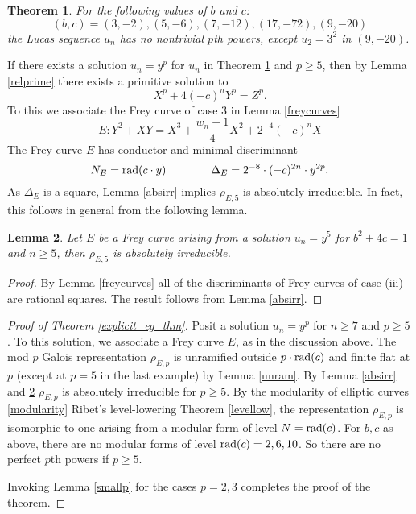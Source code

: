 \documentclass[12pt]{amsart}
\newtheorem{thm}{Theorem}[section]
\newtheorem{lem}[thm]{Lemma}
\theoremstyle{definition}
\newcommand{\rad}{{\rm{rad}}}
\begin{document}
\begin{thm}\label{explicit_eg_thm_inplace}
For the following values of $b$ and $c$:
\begin{equation}\label{examples} (b,c) = (3,-2), (5,-6), (7,-12), (17,-72), (9,-20) \end{equation}
the Lucas sequence $u_n$ has no nontrivial $p$th powers, except $u_2 = 3^2$ in $(9,-20)$.
\end{thm}


If there exists a solution $u_n = y^p$ for $u_n$ in Theorem \ref{explicit_eg_thm_inplace} and $p \geq 5$, then by Lemma \ref{relprime} there exists a primitive solution to 
\[ X^p + 4(-c)^n Y^p = Z^p. \]
To this we associate the Frey curve of case 3 in Lemma \ref{freycurves}
\[E: Y^2 + XY = X^3 + \frac{w_n - 1}{4} X^2 + 2^{-4}(-c)^nX \]
The Frey curve $E$ has conductor and minimal discriminant
\[ N_E =\rad(c \cdot y)  \qquad \qquad \Delta_E = 2^{-8} \cdot (-c)^{2n} \cdot y^{2p}. \]
As $\Delta_E$ is a square, Lemma \ref{absirr} implies $\rho_{E,5}$ is absolutely irreducible.  In fact, this follows in general from the following lemma.

\begin{lem}\label{frey5irr}
Let $E$ be a Frey curve arising from a solution $u_n = y^5$ for $b^2+4c = 1$ and $n\geq 5$, then $\rho_{E,5}$ is absolutely irreducible.
\end{lem}
\begin{proof}
By Lemma \ref{freycurves} all of the discriminants of Frey curves of case (iii) are rational squares.  The result follows from Lemma \ref{absirr}.
\end{proof}

\begin{proof}[Proof of Theorem \ref{explicit_eg_thm}]
Posit a solution $u_n = y^p$ for $n \geq 7$ and $p \geq 5$.  To this solution, we associate a Frey curve $E$, as in the discussion above.  The mod $p$ Galois representation $\rho_{E,p}$ is unramified outside $p\cdot \rad{(c)}$ and finite flat at $p$ (except at $p=5$ in the last example) by Lemma \ref{unram}.   By Lemma \ref{absirr} and \ref{frey5irr} $\rho_{E,p}$ is absolutely irreducible for $p\geq 5$.  By the modularity of elliptic curves \ref{modularity} Ribet's level-lowering Theorem \ref{levellow}, the representation $\rho_{E,p}$ is isomorphic to one arising from a modular form of level $N = \rad(c)$.  For $b,c$ as above, there are no modular forms of level $\rad(c)=2,6,10$.  So there are no perfect $p$th powers if $p \geq 5$.

Invoking Lemma \ref{smallp} for the cases $p=2,3$ completes the proof of the theorem.
\end{proof}
\end{document}
